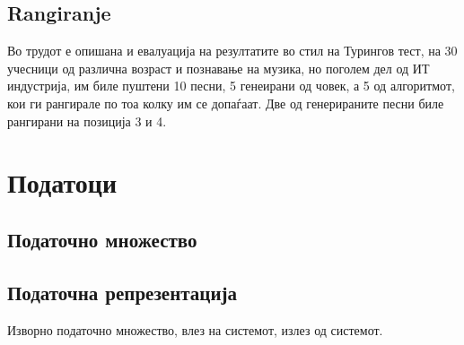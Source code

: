\section{Rangiranje}

\cite{GarciaSalas2011}

 \cite{GarciaSalas2011} Во трудот е опишана и евалуација на резултатите во стил на Турингов тест, на 30 учесници од различна возраст и познавање на музика, но поголем дел од ИТ индустрија, им биле пуштени 10 песни, 5 генеирани од човек, а 5 од алгоритмот, кои ги рангирале по тоа колку им се допаѓаат. Две од генерираните песни биле рангирани на позиција 3 и 4. 


\chapter{Податоци}

\section{Податочно множество}

\section{Податочна репрезентација }

Изворно податочно множество, влез на системот, излез од системот. 

